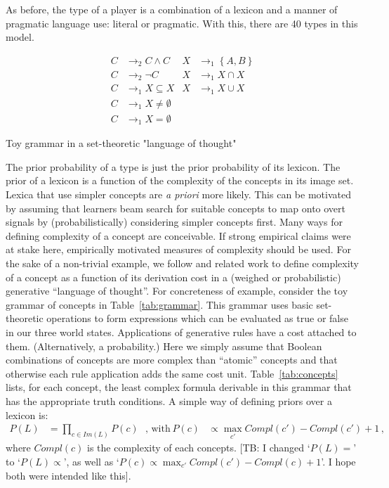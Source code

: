 \documentclass[a4paper]{article}
\newcommand{\tb}[1]{\textcolor[rgb]{.8,.33,.0}{[TB: #1]}}%
\newcommand{\set}[1]{\left\{#1\right\}}
\begin{document}
As before, the type of a player is a combination of a lexicon and a manner of pragmatic
language use: literal or pragmatic. With this, there are 40 types in this model.

\begin{table}
  \centering
  \begin{align*}
    C & \rightarrow_2 C \wedge C 
    & 
    X & \rightarrow_1 \set{A,B} \\
    C & \rightarrow_2 \neg C 
    & 
    X & \rightarrow_1 X \cap X \\
    C & \rightarrow_1 X \subseteq X
    & 
    X & \rightarrow_1 X \cup X \\
    C & \rightarrow_1 X \neq \emptyset \\
    C & \rightarrow_1 X = \emptyset     
  \end{align*}
  \caption{Toy grammar in a set-theoretic "language of thought"}
  \label{tab:grammar}
\end{table}


The prior probability of a type is just the prior probability of its lexicon. The prior of a
lexicon is a function of the complexity of the concepts in its image set. Lexica that use
simpler concepts are \emph{a priori} more likely. This can be motivated by assuming that
learners beam search for suitable concepts to map onto overt signals by (probabilistically)
considering simpler concepts first. Many ways for defining complexity of a concept are
conceivable. If strong empirical claims were at stake here, empirically motivated measures of
complexity should be used. For the sake of a non-trivial example, we follow
\citet{piantadosi+etal:underreview} and related work to define complexity of a concept as a
function of its derivation cost in a (weighed or probabilistic) generative ``language of
thought''. For concreteness of example, consider the toy grammar of concepts in
Table~\ref{tab:grammar}. This grammar uses basic set-theoretic operations to form expressions
which can be evaluated as true or false in our three world states. Applications of generative
rules have a cost attached to them. (Alternatively, a probability.) Here we simply assume that
Boolean combinations of concepts are more complex than ``atomic'' concepts and that otherwise
each rule application adds the same cost unit. Table~\ref{tab:concepts} lists, for each
concept, the least complex formula derivable in this grammar that has the appropriate truth
conditions. A simple way of defining priors over a lexicon is:
\begin{align*}
  P(L)  & = \prod_{c \in Im(L)} P(c)  \ \ \ \text{, with} & 
  P(c) & \propto \max_{c'}Compl(c') - Compl(c') + 1\,,
\end{align*}
where $Compl(c)$ is the complexity of each concepts. \tb{I changed `$P(L) = $' to `$P(L) \propto$', as well as   `$P(c) \propto \max_{c'}Compl(c') - Compl(c) + 1$'. I hope both were intended like this}.
\end{document}
